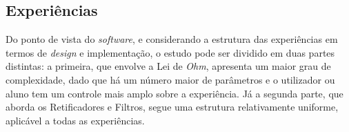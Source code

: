 \subsection{Experiências}
\label{sec:experiências}








Do ponto de vista do \textit{software}, e considerando a estrutura das experiências em termos de \textit{design} e implementação, o estudo pode ser dividido em duas partes distintas: a primeira, que envolve a Lei de \textit{Ohm}, apresenta um maior grau de complexidade, dado que há um número maior de parâmetros e o utilizador ou aluno tem um controle mais amplo sobre a experiência. Já a segunda parte, que aborda os Retificadores e Filtros, segue uma estrutura relativamente uniforme, aplicável a todas as experiências.

